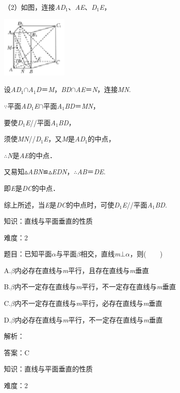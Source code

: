 \documentclass{article} %
\begin{document}
（2）如图，连接\textit{AD}${}_{1}$、\textit{AE}、\textit{D}${}_{1}$\textit{E}，

\includegraphics*[width=1.29in, height=1.21in, keepaspectratio=false]{image239}

设\textit{AD}${}_{1}$$\mathrm{\cap}$\textit{A}${}_{1}$\textit{D}＝\textit{M}，\textit{BD}$\mathrm{\cap}$\textit{AE}＝\textit{N}，连接\textit{MN}.

$\mathrm{\because}$平面\textit{AD}${}_{1}$\textit{E}$\mathrm{\cap}$平面\textit{A}${}_{1}$\textit{BD}＝\textit{MN}，

要使\textit{D}${}_{1}$\textit{E}//平面\textit{A}${}_{1}$\textit{BD}，

须使\textit{MN}//\textit{D}${}_{1}$\textit{E}，又\textit{M}是\textit{AD}${}_{1}$的中点，

$\mathrm{\therefore}$\textit{N}是\textit{AE}的中点．

又易知$\mathrm{\vartriangle}$\textit{ABN}≌$\mathrm{\vartriangle}$\textit{EDN}，$\mathrm{\therefore}$\textit{AB}＝\textit{DE}.

即\textit{E}是\textit{DC}的中点．

综上所述，当\textit{E}是\textit{DC}的中点时，可使\textit{D}${}_{1}$\textit{E}//平面\textit{A}${}_{1}$\textit{BD}.

知识：直线与平面垂直的性质

难度：2

题目：已知平面\textit{$\alpha$}与平面\textit{$\beta$}相交，直线\textit{m}$\mathrm{\bot}$\textit{$\alpha$}，则(　　)

A.\textit{$\beta$}内必存在直线与\textit{m}平行，且存在直线与\textit{m}垂直

B.\textit{$\beta$}内不一定存在直线与\textit{m}平行，不一定存在直线与\textit{m}垂直

C.\textit{$\beta$}内不一定存在直线与\textit{m}平行，必存在直线与\textit{m}垂直

D.\textit{$\beta$}内必存在直线与\textit{m}平行，不一定存在直线与\textit{m}垂直

解析：

答案：C

知识：直线与平面垂直的性质

难度：2
\end{document}
